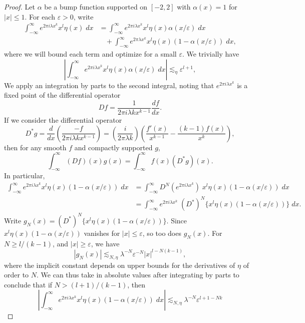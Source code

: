 \begin{proof}
  Let $\alpha$ be a bump function supported on $[-2,2]$ with $\alpha(x) = 1$ for $|x| \leq 1$. For each $\varepsilon > 0$, write
  \begin{align*}
    \int_{-\infty}^\infty e^{2 \pi i \lambda x^k} x^l \eta(x)\; dx &= \int_{-\infty}^\infty e^{2 \pi i \lambda x^k} x^l \eta(x) \alpha(x/\varepsilon)\; dx\\
    &\ \ \ \ + \int_{-\infty}^\infty e^{2 \pi \lambda x^k} x^l \eta(x) (1 - \alpha(x/\varepsilon))\; dx,
  \end{align*}
  where we will bound each term and optimize for a small $\varepsilon$. We trivially have
  \[ \left| \int_{-\infty}^\infty e^{2 \pi i \lambda x^k} x^l \eta(x) \alpha(x/\varepsilon)\; dx \right| \lesssim_\eta \varepsilon^{l+1}, \]
  We apply an integration by parts to the second integral, noting that $e^{2 \pi i \lambda x^k}$ is a fixed point of the differential operator
  \[ Df = \frac{1}{2 \pi i \lambda k x^{k-1}} \frac{df}{dx}. \]
  If we consider the differential operator
  \[ D^*g = \frac{d}{dx} \left( \frac{-f}{2 \pi i \lambda k x^{k-1}} \right) = \left( \frac{i}{2 \pi \lambda k} \right) \left( \frac{f'(x)}{x^{k-1}} - \frac{(k-1) f(x)}{x^k} \right), \]
  then for any smooth $f$ and compactly supported $g$,
  \[ \int_{-\infty}^\infty (Df)(x) g(x) = \int_{-\infty}^\infty f(x) (D^* g)(x). \]
  In particular,
  \begin{align*}
    \int_{-\infty}^\infty e^{2 \pi i \lambda x^k} x^l \eta(x) (1 - \alpha(x/\varepsilon))\; dx &= \int_{-\infty}^\infty D^N(e^{2 \pi i \lambda x^k})\; x^l \eta(x) (1 - \alpha(x/\varepsilon))\; dx\\
    &= \int_{-\infty}^\infty e^{2 \pi i \lambda x^k}\; (D^*)^N \{ x^l \eta(x) (1 - \alpha(x/\varepsilon)) \}\; dx.
  \end{align*}
  Write $g_N(x) = (D^*)^N \{ x^l \eta(x) (1 - \alpha(x/\varepsilon)) \}$. Since $x^l \eta(x) (1 - \alpha(x/\varepsilon))$ vanishes for $|x| \leq \varepsilon$, so too does $g_N(x)$. For $N \geq l/(k-1)$, and $|x| \geq \varepsilon$, we have
  \[ |g_N(x)| \lesssim_{N,\eta} \lambda^{-N} \varepsilon^{-N} |x|^{l - N(k-1)}, \]
  where the implicit constant depends on upper bounds for the derivatives of $\eta$ of order to $N$. We can thus take in absolute values after integrating by parts to conclude that if $N > (l+1)/(k-1)$, then
  \[ \left| \int_{-\infty}^\infty e^{2 \pi i \lambda x^k} x^l \eta(x) (1 - \alpha(x/\varepsilon))\; dx \right| \lesssim_{N,\eta} \lambda^{-N} \varepsilon^{l + 1 - Nk} \]

\end{proof}
